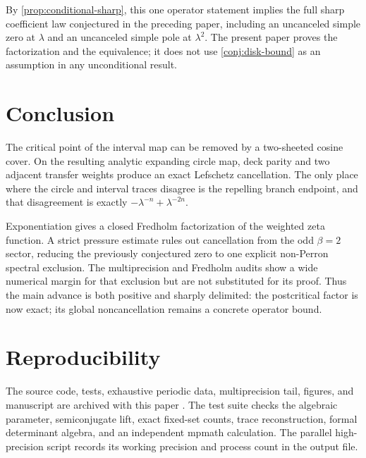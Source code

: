 \documentclass[11pt]{article}
\theoremstyle{definition}
\theoremstyle{remark}
\begin{document}
By \cref{prop:conditional-sharp}, this one operator statement implies the
full sharp coefficient law conjectured in the preceding paper, including an
uncanceled simple zero at $\lambda$ and an uncanceled simple pole at
$\lambda^2$.  The present paper proves the factorization and the equivalence;
it does not use \cref{conj:disk-bound} as an assumption in any unconditional
result.

\section{Conclusion}

The critical point of the interval map can be removed by a two-sheeted cosine
cover.  On the resulting analytic expanding circle map, deck parity and two
adjacent transfer weights produce an exact Lefschetz cancellation.  The only
place where the circle and interval traces disagree is the repelling branch
endpoint, and that disagreement is exactly
$-\lambda^{-n}+\lambda^{-2n}$.

Exponentiation gives a closed Fredholm factorization of the weighted zeta
function.  A strict pressure estimate rules out cancellation from the odd
$\beta=2$ sector, reducing the previously conjectured zero to one explicit
non-Perron spectral exclusion.  The multiprecision and Fredholm audits show a
wide numerical margin for that exclusion but are not substituted for its
proof.  Thus the main advance is both positive and sharply delimited: the
postcritical factor is now exact; its global noncancellation remains a
concrete operator bound.

\section*{Reproducibility}

The source code, tests, exhaustive periodic data, multiprecision tail,
figures, and manuscript are archived with this paper
\citep{WangPostcriticalCode2026}.  The test suite checks the algebraic
parameter, semiconjugate lift, exact fixed-set counts, trace reconstruction,
formal determinant algebra, and an independent mpmath calculation.  The
parallel high-precision script records its working precision and process
count in the output file.



\end{document}

